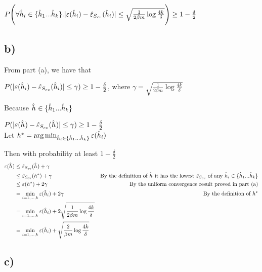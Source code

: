 \documentclass[11pt]{article}
\begin{document}
$P\Bigg(\forall \hat{h}_{i} \in \{\hat{h}_{1}...\hat{h}_{k}\}. |\varepsilon(\hat{h}_{i}) - \hat{\varepsilon}_{S_{cv}}(\hat{h}_{i})| \le \sqrt{\frac{1}{2 \beta m} \log \frac{4k}{\delta}}\Bigg) \geq 1 - \frac{\delta}{2}$

\subsection*{b)}

From part (a), we have that 

$P(|\varepsilon(\hat{h}_{i}) - \hat{\varepsilon}_{S_{cv}}(\hat{h}_{i})| \le \gamma) \geq 1 - \frac{\delta}{2}$, where $\gamma = \sqrt{\frac{1}{2 \beta m} \log \frac{4k}{\delta}}$

Because $\hat{h}_{} \in \{\hat{h}_{1}...\hat{h}_{k}\}$

$P(|\varepsilon(\hat{h}_{}) - \hat{\varepsilon}_{S_{cv}}(\hat{h}_{})| \le \gamma) \geq 1 - \frac{\delta}{2}$ \\

Let $h^* = \arg \min_{\hat{h}_{i} \in \{\hat{h}_{1}...\hat{h}_{k}\}} \varepsilon(\hat{h}_{i})$

Then with probability at least $1 - \frac{\delta}{2}$ \begin{align*}
    \varepsilon(\hat{h}_{}) &\le \hat{\varepsilon}_{S_{cv}}(\hat{h}_{}) + \gamma \\
                     &\le \hat{\varepsilon}_{S_{cv}}(h^*) + \gamma & \text{By the definition of $\hat{h}_{}$ it has the lowest $\hat{\varepsilon}_{S_{cv}}$ of any $\hat{h}_{i} \in \{\hat{h}_{1}...\hat{h}_{k}\}$} \\
                     &\le \varepsilon(h^*) + 2 \gamma & \text{By the uniform convergence result proved in part (a)} \\
                     &= \min_{i=1,...,k} \varepsilon(\hat{h}_{i}) + 2 \gamma & \text{By the definition of $h^*$} \\
                     &= \min_{i=1,...,k} \varepsilon(\hat{h}_{i}) + 2 \sqrt{\frac{1}{2 \beta m} \log \frac{4k}{\delta}} \\
                     &= \min_{i=1,...,k} \varepsilon(\hat{h}_{i}) + \sqrt{\frac{2}{\beta m} \log \frac{4k}{\delta}} \\
\end{align*}

\subsection*{c)}
\end{document}
